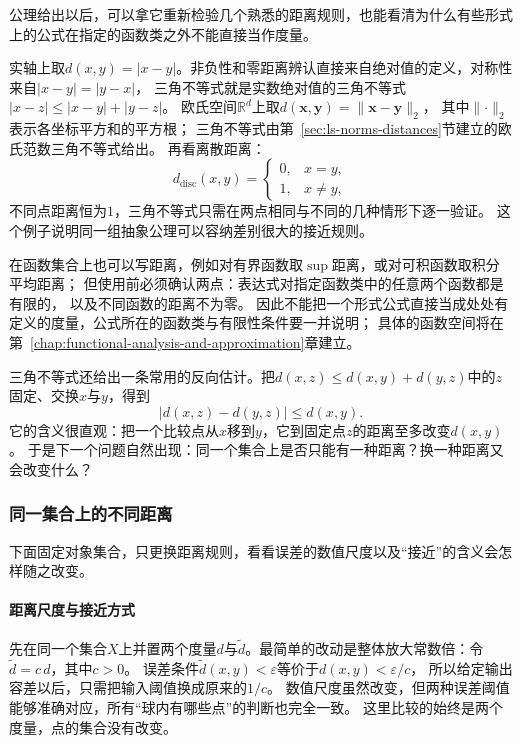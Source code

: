 公理给出以后，可以拿它重新检验几个熟悉的距离规则，也能看清为什么有些形式上的公式在指定的函数类之外不能直接当作度量。

实轴上取$d(x,y)=|x-y|$。非负性和零距离辨认直接来自绝对值的定义，对称性来自$|x-y|=|y-x|$，
三角不等式就是实数绝对值的三角不等式$|x-z|\leq|x-y|+|y-z|$。
欧氏空间$\mathbb R^d$上取$d(\bm{x},\bm{y})=\lVert\bm{x}-\bm{y}\rVert_2$，
其中$\lVert\cdot\rVert_2$表示各坐标平方和的平方根；
三角不等式由第~\ref{sec:ls-norms-distances}节建立的欧氏范数三角不等式给出。
再看离散距离：
\[
  d_{\mathrm{disc}}(x,y)=
  \begin{cases}0,&x=y,\\1,&x\neq y,\end{cases}
\]
不同点距离恒为$1$，三角不等式只需在两点相同与不同的几种情形下逐一验证。
这个例子说明同一组抽象公理可以容纳差别很大的接近规则。

在函数集合上也可以写距离，例如对有界函数取$\sup$距离，或对可积函数取积分平均距离；
但使用前必须确认两点：表达式对指定函数类中的任意两个函数都是有限的，
以及不同函数的距离不为零。
因此不能把一个形式公式直接当成处处有定义的度量，公式所在的函数类与有限性条件要一并说明；
具体的函数空间将在第~\ref{chap:functional-analysis-and-approximation}章建立。

三角不等式还给出一条常用的反向估计。把$d(x,z)\leq d(x,y)+d(y,z)$中的$z$固定、交换$x$与$y$，得到
\begin{equation}
\label{eq:metric-reverse-triangle}
  \bigl|d(x,z)-d(y,z)\bigr|\leq d(x,y).
\end{equation}
它的含义很直观：把一个比较点从$x$移到$y$，它到固定点$z$的距离至多改变$d(x,y)$。
于是下一个问题自然出现：同一个集合上是否只能有一种距离？换一种距离又会改变什么？

\subsubsection{同一集合上的不同距离}
\label{sec:metric-choice-of-metric}

下面固定对象集合，只更换距离规则，看看误差的数值尺度以及“接近”的含义会怎样随之改变。

\paragraph{距离尺度与接近方式}

先在同一个集合$X$上并置两个度量$d$与$\widetilde d$。最简单的改动是整体放大常数倍：令$\widetilde d=c\,d$，其中$c>0$。
误差条件$\widetilde d(x,y)<\varepsilon$等价于$d(x,y)<\varepsilon/c$，
所以给定输出容差以后，只需把输入阈值换成原来的$1/c$。
数值尺度虽然改变，但两种误差阈值能够准确对应，所有“球内有哪些点”的判断也完全一致。
这里比较的始终是两个度量，点的集合没有改变。

